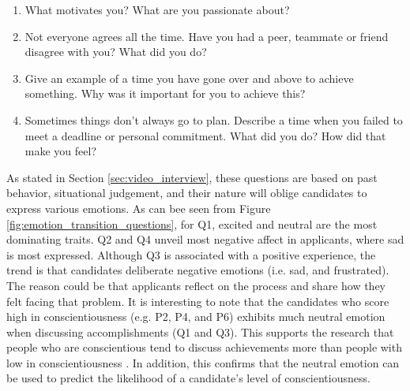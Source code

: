 %
%
\begin{enumerate}
    \item What motivates you? What are you passionate about?
    \item Not everyone agrees all the time. Have you had a peer, teammate or friend disagree with you? What did you do?
    \item Give an example of a time you have gone over and above to achieve something. Why was it important for you to achieve this?
    \item Sometimes things don’t always go to plan. Describe a time when you failed to meet a deadline or personal commitment. What did you do? How did that make you feel? 
\end{enumerate}
%
As stated in Section \ref{sec:video_interview}, these questions are based on past behavior, situational judgement, and their nature will oblige candidates to express various emotions. As can bee seen from Figure \ref{fig:emotion_transition_questions}, for Q1, excited and neutral are the most dominating traits. Q2 and Q4 unveil most negative affect in applicants, where sad is most expressed. Although Q3 is associated with a positive experience, the trend is that candidates deliberate negative emotions (i.e. sad, and frustrated). The reason could be that applicants reflect on the process and share how they felt facing that problem. It is interesting to note that the candidates who score high in conscientiousness (e.g. P2, P4, and P6) exhibits much neutral emotion when discussing accomplishments (Q1 and Q3). This supports the research that people who are conscientious tend to discuss achievements more than people with low in conscientiousness \cite{conscientiousness1-HIRSH2009524}. In addition, this confirms that the neutral emotion can be used to predict the likelihood of a candidate's level of conscientiousness. 

